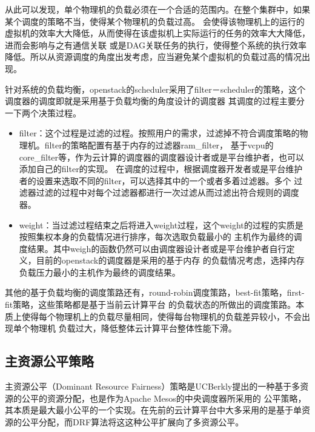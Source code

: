 从此可以发现，单个物理机的负载必须在一个合适的范围内。在整个集群中，如果某个调度的策略不当，使得某个物理机的负载过高。
会使得该物理机上的运行的虚拟机的效率大大降低，从而使得在该虚拟机上实际运行的任务的效率大大降低，进而会影响与之有通信关联
或是DAG关联任务的执行，使得整个系统的执行效率降低。所以从资源调度的角度出发考虑，应当避免某个虚拟机的负载过高的情况出现。

针对系统的负载均衡，openstack的scheduler采用了filter－scheduler的策略，这个调度器的调度即就是采用基于负载均衡的角度设计的调度器
其调度的过程主要分一下两个决策过程。
\begin{itemize}
\item filter：这个过程是过滤的过程。按照用户的需求，过滤掉不符合调度策略的物理机。filter的策略配置有基于内存的过滤器ram\_filter，
基于vcpu的core\_filter等，作为云计算的调度器的调度器设计者或是平台维护者，也可以添加自己的filter的实现。
在调度的过程中，根据调度器开发者或是平台维护者的设置来选取不同的filter，可以选择其中的一个或者多着过滤器。多个
过滤器过滤的过程中对每个过滤器都进行一次过滤从而过滤出符合规则的调度器。
\item weight：当过滤过程结束之后将进入weight过程，这个weight的过程的实质是按照集权本身的负载情况进行排序，每次选取负载最小的
主机作为最终的调度结果。其中weigh的函数仍然可以由调度器设计者或是平台维护者自行定义，目前的openstack的调度器是采用的基于内存
的负载情况考虑，选择内存负载压力最小的主机作为最终的调度结果。
\end{itemize}

其他的基于负载均衡的调度策路还有，round-robin调度策路，best-fit策略，first-fit策略，这些策略都是基于当前云计算平台
的负载状态的所做出的调度策路。本质上使得每个物理机上的负载尽量相同，使得每台物理机的负载差异较小，不会出现单个物理机
负载过大，降低整体云计算平台整体性能下滑。

\subsection{主资源公平策略}
主资源公平（Dominant Resource Fairness）策略是UCBerkly提出的一种基于多资源的公平的资源分配，也是作为Apache Mesos的中央调度器所采用的
公平策略，其本质是最大最小公平的一个实现。在先前的云计算平台中大多采用的是基于单资源的公平分配，而DRF算法将这这种公平扩展向了多资源公平。

